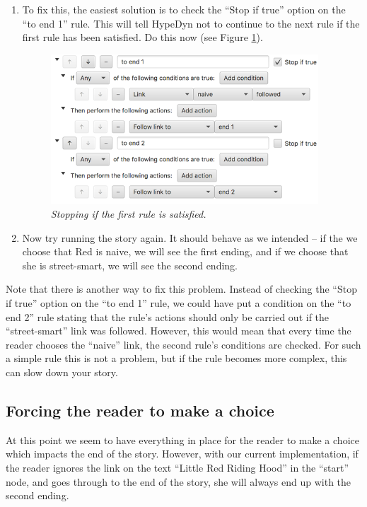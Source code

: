 \documentclass{article}
\begin{document}
\begin{enumerate}
\item To fix this, the easiest solution is to check the ``Stop if true'' option on the ``to end 1'' rule. This will tell HypeDyn not to continue to the next rule if the first rule has been satisfied. Do this now (see Figure \ref{fig:tut2:rules_with_stop}).

\begin{figure}[h]
  \centering
  \includegraphics[width=10cm]{images/hypedyn-tutorial-2-figure-6}
  \caption{\textit{Stopping if the first rule is satisfied.}}
  \label{fig:tut2:rules_with_stop}
\end{figure}

\item Now try running the story again. It should behave as we intended -- if the we choose that Red is naive, we will see the first ending, and if we choose that she is street-smart, we will see the second ending.

\end{enumerate}

Note that there is another way to fix this problem. Instead of checking the ``Stop if true'' option on the ``to end 1'' rule, we could have put a condition on the ``to end 2'' rule stating that the rule's actions should only be carried out if the ``street-smart'' link was followed. However, this would mean that every time the reader chooses the ``naive'' link, the second rule's conditions are checked. For such a simple rule this is not a problem, but if the rule becomes more complex, this can slow down your story.

\subsection{Forcing the reader to make a choice}

At this point we seem to have everything in place for the reader to make a choice which impacts the end of the story. However, with our current
implementation, if the reader ignores the link on the text ``Little Red Riding Hood'' in the ``start'' node, and goes through to the end of the story, she will always end up with the second ending.
\end{document}
